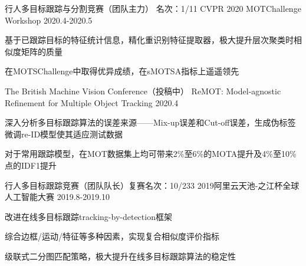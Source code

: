 
\begin{cventries}
  \cventry
    {行人多目标跟踪与分割竞赛（团队主力） 名次：1/11} %
    {CVPR 2020 MOTChallenge Workshop} %
    {} %
    {2020.4-2020.5} %
    {
        \begin{cvitems}
            \item {基于已跟踪目标的特征统计信息，精化重识别特征提取器，极大提升层次聚类时相似度矩阵的质量}
            \item {在MOTSChallenge中取得优异成绩，在sMOTSA指标上遥遥领先}
        \end{cvitems}
    }
    
 \cventry
    {The British Machine Vision Conference（投稿中）} %
    {ReMOT: Model-agnostic Refinement for Multiple Object Tracking} %
    {} %
    {2020.4} %
    {
        \begin{cvitems}
            \item {深入分析多目标跟踪算法的误差来源——Mix-up误差和Cut-off误差，生成伪标签微调re-ID模型使其适应测试数据}
            \item {对于常用跟踪模型，在MOT数据集上均可带来2\%至6\%的MOTA提升及4\%至10\%点的IDF1提升}
        \end{cvitems}
    }

  \cventry
    {行人多目标跟踪竞赛（团队队长）\quad 复赛名次：10/233} %
    {2019阿里云天池-之江杯全球人工智能大赛} %
    {} %
    {2019.8-2019.10} %
    {
        \begin{cvitems}
            \item {改进在线多目标跟踪tracking-by-detection框架}
            \item {综合边框/运动/特征等多种因素，实现复合相似度评价指标}
            \item {级联式二分图匹配策略，极大提升在线多目标跟踪算法的稳定性}
        \end{cvitems}
    }

\end{cventries}
